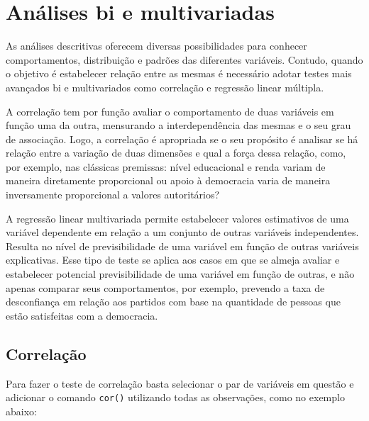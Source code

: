 \documentclass[
  10pt,
  brazil,
  a4paper,
  twoside, notitlepage, openright]{book}
\newenvironment{Shaded}{\begin{snugshade}}{\end{snugshade}}
\newcommand{\CommentTok}[1]{\textcolor[rgb]{0.56,0.35,0.01}{\textit{#1}}}
\newcommand{\DataTypeTok}[1]{\textcolor[rgb]{0.13,0.29,0.53}{#1}}
\newcommand{\KeywordTok}[1]{\textcolor[rgb]{0.13,0.29,0.53}{\textbf{#1}}}
\newcommand{\NormalTok}[1]{#1}
\newcommand{\OperatorTok}[1]{\textcolor[rgb]{0.81,0.36,0.00}{\textbf{#1}}}
\newcommand{\StringTok}[1]{\textcolor[rgb]{0.31,0.60,0.02}{#1}}
\begin{document}
\hypertarget{anuxe1lises-bi-e-multivariadas}{%
\section{Análises bi e multivariadas}\label{anuxe1lises-bi-e-multivariadas}}

As análises descritivas oferecem diversas possibilidades para conhecer comportamentos, distribuição e padrões das diferentes variáveis. Contudo, quando o objetivo é estabelecer relação entre as mesmas é necessário adotar testes mais avançados bi e multivariados como correlação e regressão linear múltipla.

A correlação tem por função avaliar o comportamento de duas variáveis em função uma da outra, mensurando a interdependência das mesmas e o seu grau de associação. Logo, a correlação é apropriada se o seu propósito é analisar se há relação entre a variação de duas dimensões e qual a força dessa relação, como, por exemplo, nas clássicas premissas: nível educacional e renda variam de maneira diretamente proporcional ou apoio à democracia varia de maneira inversamente proporcional a valores autoritários?

A regressão linear multivariada permite estabelecer valores estimativos de uma variável dependente em relação a um conjunto de outras variáveis independentes. Resulta no nível de previsibilidade de uma variável em função de outras variáveis explicativas. Esse tipo de teste se aplica aos casos em que se almeja avaliar e estabelecer potencial previsibilidade de uma variável em função de outras, e não apenas comparar seus comportamentos, por exemplo, prevendo a taxa de desconfiança em relação aos partidos com base na quantidade de pessoas que estão satisfeitas com a democracia.

\hypertarget{correlauxe7uxe3o}{%
\subsection{Correlação}\label{correlauxe7uxe3o}}

Para fazer o teste de correlação basta selecionar o par de variáveis em questão e adicionar o comando \texttt{cor()} utilizando todas as observações, como no exemplo abaixo:

\begin{Shaded}
\end{Shaded}
\end{document}
